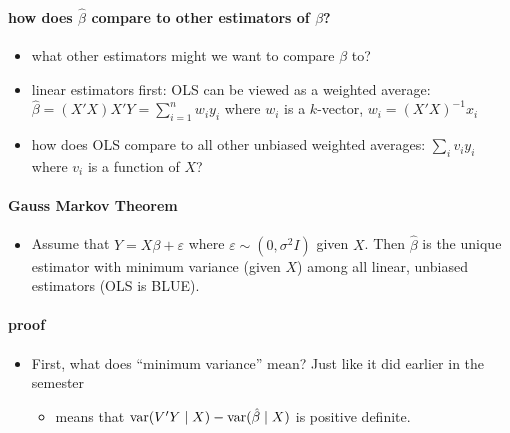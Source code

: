 \paragraph{how does $\hat\beta$ compare to other estimators of $\beta$?}
\label{sec-3-1-5}

\begin{itemize}
\item what other estimators might we want to compare $\beta$ to?
\item linear estimators first: OLS can be viewed as a weighted average:
        $\hat \beta = (X'X) X'Y = \sum_{i=1}^n w_i y_i$ where $w_i$ is a
        $k$-vector, $w_i = (X'X)^{-1} x_i$
\item how does OLS compare to all other unbiased weighted averages:
        $\sum_i v_i y_i$ where $v_i$ is a function of $X$?
\end{itemize}
\paragraph{Gauss Markov Theorem}
\label{sec-3-1-5-1}

\begin{itemize}
\item Assume that $Y = X\beta + \varepsilon$ where $\varepsilon \sim
         (0, \sigma^2 I)$ given $X$.  Then $\hat\beta$ is the unique
         estimator with minimum variance (given $X$) among all linear,
         unbiased estimators (OLS is BLUE).
\end{itemize}
\paragraph{proof}
\label{sec-3-1-5-1-1}

\begin{itemize}
\item First, what does ``minimum variance'' mean?  Just like it did
          earlier in the semester
\begin{itemize}
\item means that $\operatorname{var}(V'Y \mid X) - \operatorname{var}(\hat\beta \mid X)$ is
            positive definite.
\end{itemize}
\end{itemize}

